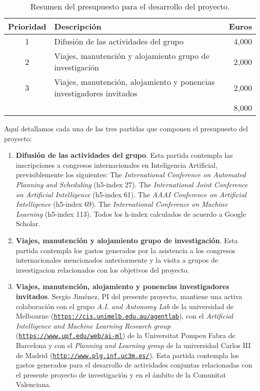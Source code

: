 \documentclass[10pt,a4paper]{paper}
\begin{document}
\begin{table}[hbt!]
\begin{small}  
  \begin{tabular}{cl|r}
    {\bf Prioridad} & {\bf Descripción} & {\bf Euros} \\\hline
1 & {\scriptsize Difusión de las actividades del grupo}  & 4,000\\    
2 & {\scriptsize Viajes, manutención y alojamiento grupo de investigación} & 2,000\\
3 & {\scriptsize Viajes, manutención, alojamiento y ponencias investigadores invitados} & 2,000\\\hline
\multicolumn{2}{l|}{} & 8,000 \\
  \end{tabular}
\end{small}
\caption{\small Resumen del presupuesto para el desarrollo del proyecto.}
\end{table}

Aquí detallamos cada una de las tres partidas que componen el presupuesto del proyecto:
\begin{enumerate}
\item {\bf Difusión de las actividades del grupo}. Esta partida contempla las inscripciones a congresos internacionales en Inteligencia Artificial, previsiblemente los siguientes: The {\em International Conference on Automated Planning and Scheduling} (h5-index 27). The {\em International Joint Conference on Artificial Intelligence} (h5-index 61). The {\em AAAI Conference on Artificial Intelligence} (h5-index 69). The {\em International Conference on Machine Learning} (h5-index 113). Todos los h-index calculados de acuerdo a Google Scholar.
\item {\bf Viajes, manutención y alojamiento grupo de investigación}. Esta partida contempla los gastos generados por la asistencia a los congresos internacionales mencionados anteriormente y la visita a grupos de investigacion relacionados con los objetivos del proyecto.
\item {\bf Viajes, manutención, alojamiento y ponencias investigadores invitados}. Sergio Jiménez, PI del presente proyecto, mantiene una activa colaboración con el grupo {\em A.I. and Autonomy Lab} de la universidad de Melbourne ({\tt\small\url{https://cis.unimelb.edu.au/agentlab}}), con el {\em Artificial Intelligence and Machine Learning Research group} ({\tt\small\url{https://www.upf.edu/web/ai-ml}}) de la Universitat Pompeu Fabra de Barcelona y con el {\em Planning and Learning group} de la universidad Carlos III de Madrid ({\tt\small\url{http://www.plg.inf.uc3m.es/}}).  Esta partida contempla los gastos generados para el desarrollo de actividades conjuntas relacionadas con el presente proyecto de investigación y en el ámbito de la Comunitat Valenciana. 
\end{enumerate}
\end{document}
